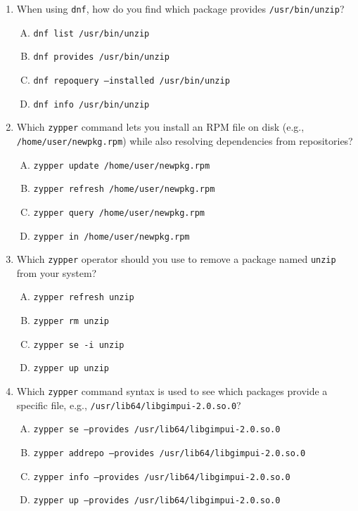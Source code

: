 \documentclass[a4paper]{report}
\begin{document}
\begin{enumerate}[1.]
    \item When using \texttt{dnf}, how do you find which package provides \texttt{/usr/bin/unzip}?  
    \begin{enumerate}[A)]
        \item \texttt{dnf list /usr/bin/unzip}  
        \item \texttt{dnf provides /usr/bin/unzip}  
        \item \texttt{dnf repoquery --installed /usr/bin/unzip}  
        \item \texttt{dnf info /usr/bin/unzip}  
    \end{enumerate}

    \item Which \texttt{zypper} command lets you install an RPM file on disk (e.g., \texttt{/home/user/newpkg.rpm}) while also resolving dependencies from repositories?  
    \begin{enumerate}[A)]
        \item \texttt{zypper update /home/user/newpkg.rpm}  
        \item \texttt{zypper refresh /home/user/newpkg.rpm}  
        \item \texttt{zypper query /home/user/newpkg.rpm}  
        \item \texttt{zypper in /home/user/newpkg.rpm}  
    \end{enumerate}

    \item Which \texttt{zypper} operator should you use to remove a package named \texttt{unzip} from your system?  
    \begin{enumerate}[A)]
        \item \texttt{zypper refresh unzip}  
        \item \texttt{zypper rm unzip}  
        \item \texttt{zypper se -i unzip}  
        \item \texttt{zypper up unzip}  
    \end{enumerate}

    \item Which \texttt{zypper} command syntax is used to see which packages provide a specific file, e.g., \texttt{/usr/lib64/libgimpui-2.0.so.0}?  
    \begin{enumerate}[A)]
        \item \texttt{zypper se --provides /usr/lib64/libgimpui-2.0.so.0}  
        \item \texttt{zypper addrepo --provides /usr/lib64/libgimpui-2.0.so.0}  
        \item \texttt{zypper info --provides /usr/lib64/libgimpui-2.0.so.0}  
        \item \texttt{zypper up --provides /usr/lib64/libgimpui-2.0.so.0}  
    \end{enumerate}


\end{enumerate}
\end{document}
